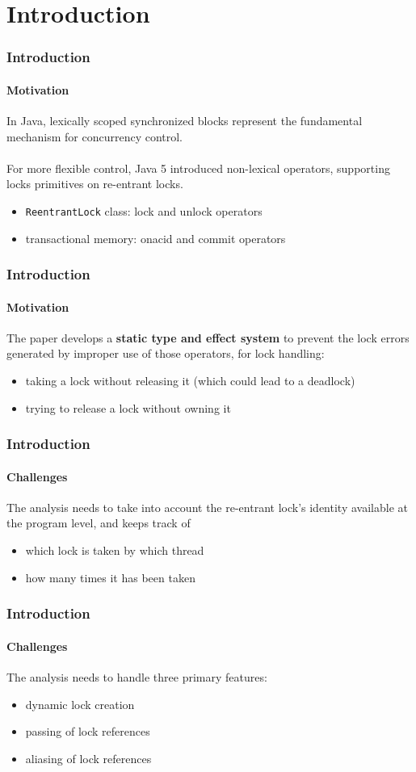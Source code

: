 \section{Introduction}


\begin{frame}
\frametitle{Introduction}
\framesubtitle{Motivation}
In Java, lexically scoped synchronized blocks represent the fundamental mechanism for concurrency control.
\\\\
For more flexible control, Java 5 introduced non-lexical operators, supporting locks primitives on re-entrant locks.

\begin{itemize}
    \item \texttt{ReentrantLock} class: lock and unlock operators
    \item transactional memory: onacid and commit operators
\end{itemize}
\end{frame}

\begin{frame}
\frametitle{Introduction}
\framesubtitle{Motivation}
The paper develops a \textbf{static type and effect system} to prevent the lock errors generated by improper use of those operators, for lock handling:
\begin{itemize}
    \item taking a lock without releasing it (which could lead to a deadlock)
    \item trying to release a lock without owning it
\end{itemize}
\end{frame}

\begin{frame}
\frametitle{Introduction}
\framesubtitle{Challenges}
The analysis needs to take into account the re-entrant lock's identity available at the program level, and keeps track of 
\begin{itemize}
    \item which lock is taken by which thread \item how many times it has been taken
\end{itemize}
\end{frame}

\begin{frame}
\frametitle{Introduction}
\framesubtitle{Challenges}
The analysis needs to handle three primary features: 
\begin{itemize}
    \item dynamic lock creation 
    \item passing of lock references
    \item aliasing of lock references
\end{itemize}
\end{frame}
